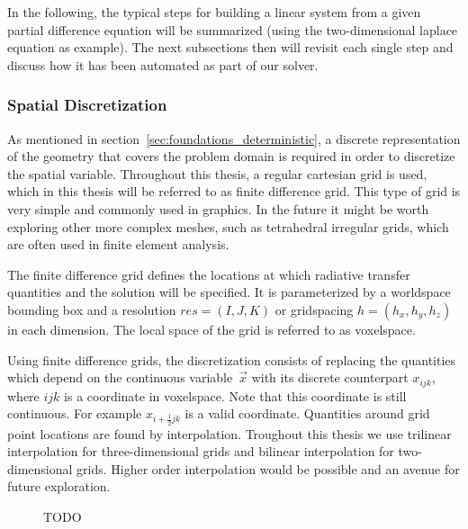 In the following, the typical steps for building a linear system from a given partial difference equation will be summarized (using the two-dimensional laplace equation as example). The next subsections then will revisit each single step and discuss how it has been automated as part of our solver.

\subsubsection*{Spatial Discretization}

As mentioned in section~\ref{sec:foundations_deterministic}, a discrete representation of the geometry that covers the problem domain is required in order to discretize the spatial variable. Throughout this thesis, a regular cartesian grid is used, which in this thesis will be referred to as finite difference grid. This type of grid is very simple and commonly used in graphics. In the future it might be worth exploring other more complex meshes, such as tetrahedral irregular grids, which are often used in finite element analysis. 

The finite difference grid defines the locations at which radiative transfer quantities and the solution will be specified. It is parameterized by a worldspace bounding box and a resolution $res=(I,J,K)$ or gridspacing $h=(h_x, h_y, h_z)$ in each dimension. The local space of the grid is referred to as voxelspace.

Using finite difference grids, the discretization consists of replacing the quantities which depend on the continuous variable~$\vec{x}$ with its discrete counterpart $x_{ijk}$, where $ijk$ is a coordinate in voxelspace. Note that this coordinate is still continuous. For example $x_{i+\frac{1}{2}jk}$ is a valid coordinate. Quantities around grid point locations are found by interpolation. Troughout this thesis we use trilinear interpolation for three-dimensional grids and bilinear interpolation for two-dimensional grids. Higher order interpolation would be possible and an avenue for future exploration.
\begin{figure}[h]
\centering
{}
\caption{TODO}
\label{fig:pn_solver_finite_difference_grid}
\end{figure}

